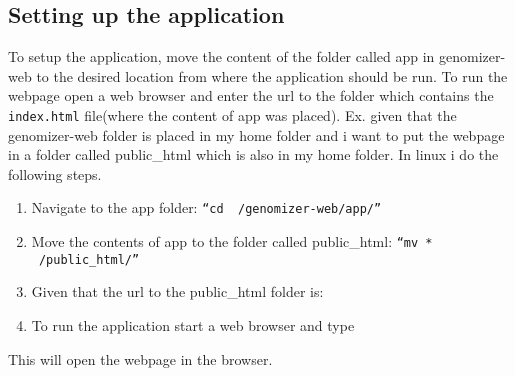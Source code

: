 \subsection{Setting up the application}
To setup the application, move the content of the folder called app in genomizer-web to the desired location from where the application should be run. To run the webpage open a web browser and enter the url to the folder which contains the \texttt{index.html} file(where the content of app was placed).
Ex. given that the genomizer-web folder is placed in my home folder and i want to put the webpage in a folder called public\_html which is also in my home folder. In linux i do the following steps.
\begin{enumerate}
	\item Navigate to the app folder: \texttt{“cd ~/genomizer-web/app/”}
	\item Move the contents of app to the folder called public\_html: \texttt{“mv * ~/public\_html/”}
	\item Given that the url to the public\_html folder is: 
	\item To run the application start a web browser and type 
\end{enumerate}
This will open the webpage in the browser.

